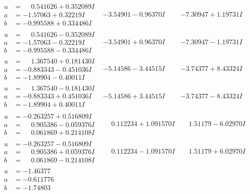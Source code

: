 \documentclass[1p]{elsarticle_modified}
\theoremstyle{definition}
\begin{document}
$$\begin{array}{c|c|c}
\begin{aligned}
u &= \phantom{-}0.541626 + 0.352089 I \\
a &= -1.57063 + 0.32219 I \\
b &= -0.995588 + 0.334486 I\end{aligned}
 & -3.54901 - 0.96370 I & -7.30947 + 1.19731 I \\ \hline\begin{aligned}
u &= \phantom{-}0.541626 - 0.352089 I \\
a &= -1.57063 - 0.32219 I \\
b &= -0.995588 - 0.334486 I\end{aligned}
 & -3.54901 + 0.96370 I & -7.30947 - 1.19731 I \\ \hline\begin{aligned}
u &= \phantom{-}1.367540 + 0.181430 I \\
a &= -0.883343 - 0.451036 I \\
b &= -1.89904 - 0.40011 I\end{aligned}
 & -5.14586 - 3.44515 I & -3.74377 + 8.43324 I \\ \hline\begin{aligned}
u &= \phantom{-}1.367540 - 0.181430 I \\
a &= -0.883343 + 0.451036 I \\
b &= -1.89904 + 0.40011 I\end{aligned}
 & -5.14586 + 3.44515 I & -3.74377 - 8.43324 I \\ \hline\begin{aligned}
u &= -0.263257 + 0.516809 I \\
a &= \phantom{-}0.905386 - 0.059376 I \\
b &= \phantom{-}0.061869 + 0.214108 I\end{aligned}
 & \phantom{-}0.112234 + 1.091570 I & \phantom{-}1.51179 - 6.02970 I \\ \hline\begin{aligned}
u &= -0.263257 - 0.516809 I \\
a &= \phantom{-}0.905386 + 0.059376 I \\
b &= \phantom{-}0.061869 - 0.214108 I\end{aligned}
 & \phantom{-}0.112234 - 1.091570 I & \phantom{-}1.51179 + 6.02970 I \\ \hline\begin{aligned}
u &= -1.46377\phantom{ +0.000000I} \\
a &= -0.611776\phantom{ +0.000000I} \\
b &= -1.74803\phantom{ +0.000000I}\end{aligned}

\end{array}$$
\end{document}
